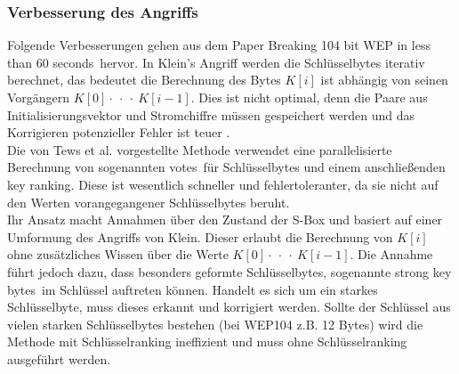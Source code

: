 \documentclass[10pt,a4paper]{article}
\begin{document}
\subsubsection{Verbesserung des Angriffs}
Folgende Verbesserungen gehen aus dem Paper \glqq Breaking 104 bit WEP in less than 60 seconds\grqq \cite{TWP07}\ hervor.
In Klein's Angriff werden die Schlüsselbytes iterativ berechnet, das bedeutet die Berechnung des Bytes $K[i]$ ist abhängig von seinen Vorgängern $K[0] \cdot\ \cdot\ \cdot\ K[i-1]$. Dies ist nicht optimal, denn die Paare aus Initialisierungsvektor und Stromchiffre müssen gespeichert werden und das Korrigieren potenzieller Fehler ist teuer \cite[Kapitel 4]{TWP07}.\\
Die von Tews et al. vorgestellte Methode verwendet eine parallelisierte Berechnung von sogenannten \glqq votes\grqq\ für Schlüsselbytes und einem anschließenden \glqq key ranking\grqq . Diese ist wesentlich schneller und fehlertoleranter, da sie nicht auf den Werten vorangegangener Schlüsselbytes beruht.\\
Ihr Ansatz macht Annahmen über den Zustand der S-Box \cite[Kapitel 4, (4)-(5)]{TWP07} und basiert auf einer Umformung des Angriffs von Klein. Dieser erlaubt die Berechnung von $K[i]$ ohne zusätzliches Wissen über die Werte $K[0] \cdot\ \cdot\ \cdot\ K[i-1]$. Die Annahme führt jedoch dazu, dass besonders geformte Schlüsselbytes, sogenannte \glqq strong key bytes\grqq\ im Schlüssel auftreten können. Handelt es sich um ein starkes Schlüsselbyte, muss dieses erkannt und korrigiert werden. Sollte der Schlüssel aus vielen starken Schlüsselbytes bestehen (bei WEP104 z.B. 12 Bytes) wird die Methode mit Schlüsselranking ineffizient und muss ohne Schlüsselranking ausgeführt werden.
\end{document}
